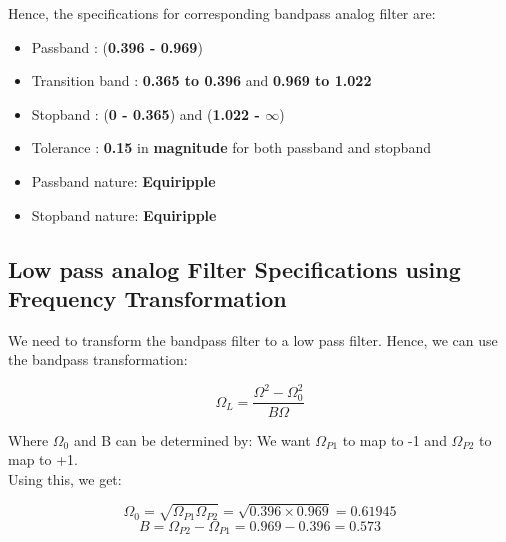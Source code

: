 \documentclass{article}
\begin{document}
Hence, the specifications for corresponding bandpass analog filter are:
\begin{itemize}
    \item Passband : (\textbf{0.396 -  0.969})
    \item  Transition band : \textbf{0.365 to 0.396} and \textbf{0.969 to 1.022}
    \item Stopband : (\textbf{0 - 0.365}) and (\textbf{1.022 - $\infty$})
    \item  Tolerance : \textbf{0.15} in \textbf{magnitude} for both passband and stopband
    \item Passband nature: \textbf{Equiripple}
    \item Stopband nature: \textbf{Equiripple}
\end{itemize}

\subsection{Low pass analog Filter Specifications using Frequency
Transformation}

We need to transform the bandpass filter to a low pass filter. Hence, we can use the bandpass transformation:
\vspace{-5mm}
\begin{center}
    \begin{equation*}
        \Omega_L = \frac{\Omega^2-\Omega_0^2}{B\Omega}
    \end{equation*}
\end{center}

Where $\Omega_0$ and B can be determined by:
We want $\Omega_{P1}$ to map to -1 and $\Omega_{P2}$ to map to +1.\\
Using this, we get:
\begin{center}
    \begin{equation*}
        \Omega_0 = \sqrt{\Omega_{P1}\Omega_{P2}} = \sqrt{0.396 \times 0.969} = 0.61945
    \end{equation*}
    \begin{equation*}
        B = \Omega_{P2} - \Omega_{P1} = 0.969 - 0.396 = 0.573
    \end{equation*}
\end{center}
\end{document}
